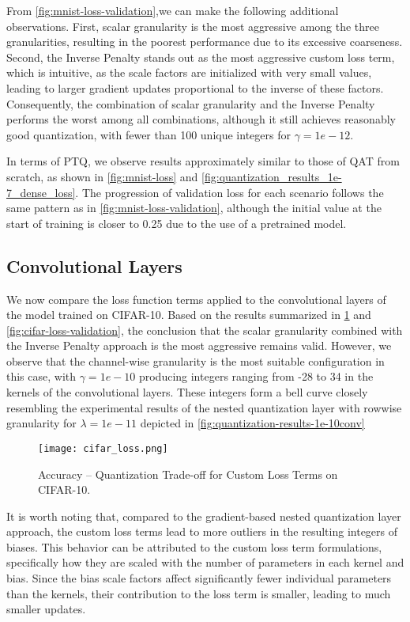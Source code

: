 From \cref{fig:mnist-loss-validation},we can make the following additional observations.
First, scalar granularity is the most aggressive among the three granularities, 
resulting in the poorest performance due to its excessive coarseness.
Second, the Inverse Penalty stands out as the most aggressive custom loss term,
which is intuitive, as the scale factors are initialized with very small values, 
leading to larger gradient updates proportional to the inverse of these factors.
Consequently, the combination of scalar granularity and the Inverse Penalty performs the worst among all combinations,
although it still achieves reasonably good quantization,
with fewer than 100 unique integers for  \( \gamma = 1e-12 \).


In terms of PTQ, we observe results approximately similar to those of QAT from scratch, 
as shown in \cref{fig:mnist-loss} and \cref{fig:quantization_results_1e-7_dense_loss}. 
The progression of validation loss for each scenario follows the same pattern as in \cref{fig:mnist-loss-validation}, 
although the initial value at the start of training is closer to 0.25 due to the use of a pretrained model.


\newpage


\subsection{Convolutional Layers}
\label{subsec:convolutionallayerscustomloss}

\hspace*{1em} We now compare the loss function terms applied to the convolutional layers of the model trained on CIFAR-10. 
Based on the results summarized in \cref{fig:cifar-loss} and \cref{fig:cifar-loss-validation}, 
the conclusion that the scalar granularity combined with the Inverse Penalty approach is the most aggressive remains valid. 
However, we observe that the channel-wise granularity is the most suitable configuration in this case, 
with \( \gamma = 1e-10 \) producing integers ranging from -28 to 34 in the kernels of the convolutional layers.
These integers form a bell curve closely resembling the experimental results of the nested quantization layer
with rowwise granularity for \( \lambda = 1e-11\) depicted in \cref{fig:quantization-results-1e-10conv}
\begin{figure}[t!]
  \centering
  \texttt{[image: cifar\_loss.png]}
  \caption{Accuracy – Quantization Trade-off for Custom Loss Terms on CIFAR-10.}
  \label{fig:cifar-loss}
\end{figure}
It is worth noting that, 
compared to the gradient-based nested quantization layer approach, the custom loss terms
lead to more outliers in the resulting integers of biases.
This behavior can be attributed to the custom loss term formulations, 
specifically how they are scaled with the number of parameters in each kernel and bias.
Since the bias scale factors affect significantly fewer individual parameters than the kernels, 
their contribution to the loss term is smaller, leading to much smaller updates.

